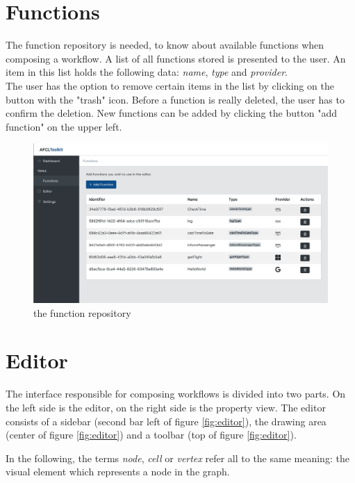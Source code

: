 \documentclass[a4paper,top=25mm,bottom=25mm,12pt,pdftex,halfparskip,twoside,bibtotoc,numbers=noenddot]{scrbook}
\begin{document}
\section{Functions}


The function repository is needed, to know about available functions when composing a workflow.  A list of all functions stored is presented to the user. An item in this list holds the following data: \textit{name}, \textit{type} and \textit{provider}.\\
The user has the option to remove certain items in the list by clicking on the button with the "trash" icon. Before a function is really deleted, the user has to confirm the deletion.
New functions can be added by clicking the button "add function" on the upper left.

\begin{figure}[H]
  \centering
  \includegraphics[width=\textwidth]{functions}
  \caption{the function repository}
\end{figure}

\section{Editor}
The interface responsible for composing workflows is divided into two parts. On the left side is the editor, on the right side is the property view. The editor consists of a sidebar (second bar left of figure \ref{fig:editor}), the drawing area (center of figure \ref{fig:editor}) and a toolbar (top of figure \ref{fig:editor}).

In the following, the terms \textit{node}, \textit{cell} or \textit{vertex} refer all to the same meaning: the visual element which represents a node in the graph.
\end{document}
